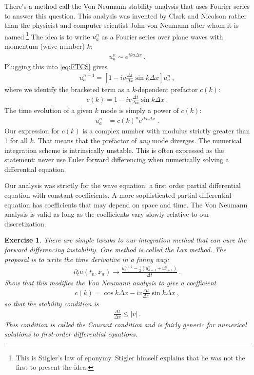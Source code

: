 \documentclass[
  11pt,
	colorful,
	raggedright,
]{tufte-style-thesis-flip}
\newtheorem{exercise}{Exercise}[section]
\begin{document}
There's a method call the Von Neumann stability analysis that uses Fourier series to answer this question. This analysis was invented by Clark and Nicolson rather than the physicist and computer scientist John von Neumann after whom it is named.\footnote{This is Stigler's law of eponymy. Stigler himself explains that he was not the first to present the idea.} The idea is to write $u^n_a$ as a Fourier series over plane waves with momentum (wave number) $k$:
\begin{align}
  u^n_a \sim  e^{ika\Delta x} \ .
\end{align}
Plugging this into \eqref{eq:FTCS} gives
\begin{align}
  u^{n+1}_a = 
  \left[1 - i v\frac{\Delta t}{\Delta x}\sin k\Delta x\right]u^n_a \ ,
\end{align}
where we identify the bracketed term as a $k$-dependent prefactor $c(k)$:
\begin{align}
   c(k) = 1 - i v\frac{\Delta t}{\Delta x}\sin k\Delta x \ .
\end{align}
The time evolution of a given $k$ mode is simply a power of $c(k)$:
\begin{align}
  u^{n}_a &= c(k)^n e^{ika\Delta x} \ .
\end{align}
Our expression for $c(k)$ is a complex number with modulus strictly greater than 1 for all $k$. That means that the prefactor of \emph{any} mode diverges. The numerical integration scheme is intrinsically unstable. This is often expressed as the statement: never use Euler forward differencing when numerically solving a differential equation.

Our analysis was strictly for the wave equation: a first order partial differential equation with constant coefficients. A more sophisticated partial differential equation has coefficients that may depend on space and time. The Von Neumann analysis is valid as long as the coefficients vary slowly relative to our discretization.

\begin{exercise}
There are simple tweaks to our integration method that can cure the forward differencing instability. One method is called the Lax method. The proposal is to write the time derivative in a funny way:
\begin{align}
  \partial_t u(t_n, x_a) \to
  \frac{
    u^{n+1}_a 
    - \frac{1}{2}\left(u^n_{a-1}+u^n_{a+1}\right)
    }{ \Delta t } \ .
\end{align}
Show that this modifies the Von Neumann analysis to give a coefficient
\begin{align}
  c(k) = \cos k\Delta x - i v\frac{\Delta t}{\Delta x}\sin k\Delta x \ ,
\end{align}
so that the stability condition is
\begin{align}
\frac{\Delta t}{\Delta x} \leq |v| \ .
\end{align}
This condition is called the Courant condition and is fairly generic for numerical solutions to first-order differential equations.
\end{exercise}
\end{document}

